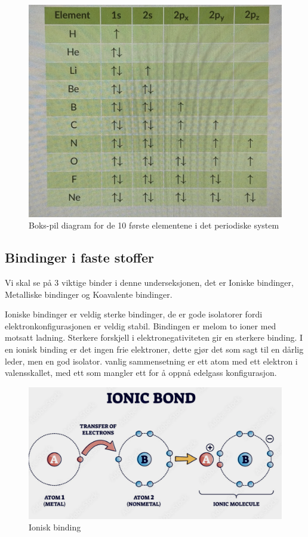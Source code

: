 \begin{figure}[!htb]
    \centering
    \includegraphics[scale=1]{Bilder/SamtaleTema3/box-arrow.png}
    \caption{Boks-pil diagram for de 10 første elementene i det periodiske system}
    \label{fig:box-arrow}
\end{figure}


\subsection{Bindinger i faste stoffer}
\label{sec:tema3_6}
Vi skal se på 3 viktige binder i denne underseksjonen, det er Ioniske bindinger, Metalliske bindinger og Koavalente bindinger.

Ioniske bindinger er veldig sterke bindinger, de er gode isolatorer fordi elektronkonfigurasjonen er veldig stabil. Bindingen er melom to ioner med motsatt ladning. Sterkere forskjell i elektronegativiteten gir en sterkere binding. I en ionisk binding er det ingen frie elektroner, dette gjør det som sagt til en dårlig leder, men en god isolator. vanlig sammensetning er ett atom med ett elektron i valensskallet, med ett som mangler ett for å oppnå edelgass konfigurasjon.

\begin{figure}[!htb]
    \centering
    \includegraphics[scale=0.4]{Bilder/SamtaleTema3/Bindinger/ionic.png}
    \caption{Ionisk binding}
    \label{fig:ione}
\end{figure}

